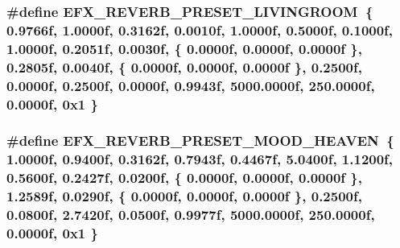 \subsubsection[{\texorpdfstring{E\+F\+X\+\_\+\+R\+E\+V\+E\+R\+B\+\_\+\+P\+R\+E\+S\+E\+T\+\_\+\+L\+I\+V\+I\+N\+G\+R\+O\+OM}{EFX_REVERB_PRESET_LIVINGROOM}}]{\setlength{\rightskip}{0pt plus 5cm}\#define E\+F\+X\+\_\+\+R\+E\+V\+E\+R\+B\+\_\+\+P\+R\+E\+S\+E\+T\+\_\+\+L\+I\+V\+I\+N\+G\+R\+O\+OM~\{ 0.\+9766f, 1.\+0000f, 0.\+3162f, 0.\+0010f, 1.\+0000f, 0.\+5000f, 0.\+1000f, 1.\+0000f, 0.\+2051f, 0.\+0030f, \{ 0.\+0000f, 0.\+0000f, 0.\+0000f \}, 0.\+2805f, 0.\+0040f, \{ 0.\+0000f, 0.\+0000f, 0.\+0000f \}, 0.\+2500f, 0.\+0000f, 0.\+2500f, 0.\+0000f, 0.\+9943f, 5000.\+0000f, 250.\+0000f, 0.\+0000f, 0x1 \}}\hypertarget{efx-presets_8h_a5875bf429c4a85ca8038e9977bc1eca2}{}\label{efx-presets_8h_a5875bf429c4a85ca8038e9977bc1eca2}
\subsubsection[{\texorpdfstring{E\+F\+X\+\_\+\+R\+E\+V\+E\+R\+B\+\_\+\+P\+R\+E\+S\+E\+T\+\_\+\+M\+O\+O\+D\+\_\+\+H\+E\+A\+V\+EN}{EFX_REVERB_PRESET_MOOD_HEAVEN}}]{\setlength{\rightskip}{0pt plus 5cm}\#define E\+F\+X\+\_\+\+R\+E\+V\+E\+R\+B\+\_\+\+P\+R\+E\+S\+E\+T\+\_\+\+M\+O\+O\+D\+\_\+\+H\+E\+A\+V\+EN~\{ 1.\+0000f, 0.\+9400f, 0.\+3162f, 0.\+7943f, 0.\+4467f, 5.\+0400f, 1.\+1200f, 0.\+5600f, 0.\+2427f, 0.\+0200f, \{ 0.\+0000f, 0.\+0000f, 0.\+0000f \}, 1.\+2589f, 0.\+0290f, \{ 0.\+0000f, 0.\+0000f, 0.\+0000f \}, 0.\+2500f, 0.\+0800f, 2.\+7420f, 0.\+0500f, 0.\+9977f, 5000.\+0000f, 250.\+0000f, 0.\+0000f, 0x1 \}}\hypertarget{efx-presets_8h_a57bd7019d4f82fc9cbc1e9e1796c7bff}{}\label{efx-presets_8h_a57bd7019d4f82fc9cbc1e9e1796c7bff}
